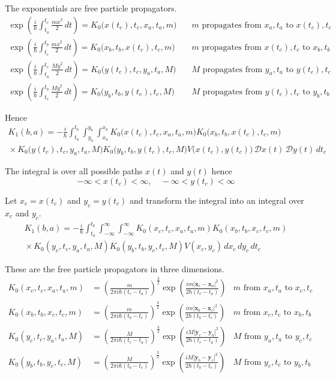 The exponentials are free particle propagators.
\begin{align*}
\exp\left(\frac{i}{\hbar}\int_{t_a}^{t_c}\frac{m\dot x^2}{2}\,dt\right)
=K_0\bigl(x(t_c),t_c,x_a,t_a,m\bigr)
&\quad\text{$m$ propagates from $x_a,t_a$ to $x(t_c),t_c$}
\\
\exp\left(\frac{i}{\hbar}\int_{t_c}^{t_b}\frac{m\dot x^2}{2}\,dt\right)
=K_0\bigl(x_b,t_b,x(t_c),t_c,m\bigr)
&\quad\text{$m$ propagates from $x(t_c),t_c$ to $x_b,t_b$}
\\
\exp\left(\frac{i}{\hbar}\int_{t_a}^{t_c}\frac{M\dot y^2}{2}\,dt\right)
=K_0\bigl(y(t_c),t_c,y_a,t_a,M\bigr)
&\quad\text{$M$ propagates from $y_a,t_a$ to $y(t_c),t_c$}
\\
\exp\left(\frac{i}{\hbar}\int_{t_c}^{t_b}\frac{M\dot y^2}{2}\,dt\right)
=K_0\bigl(y_b,t_b,y(t_c),t_c,M\bigr)
&\quad\text{$M$ propagates from $y(t_c),t_c$ to $y_b,t_b$}
\end{align*}

Hence
\begin{multline*}
K_1(b,a)=-\frac{i}{\hbar}\int_{t_a}^{t_b}\int_{y_a}^{y_b}\int_{x_a}^{x_b}
K_0\bigl(x(t_c),t_c,x_a,t_a,m\bigr)
K_0\bigl(x_b,t_b,x(t_c),t_c,m\bigr)
\\
{}\times
K_0\bigl(y(t_c),t_c,y_a,t_a,M\bigr)
K_0\bigl(y_b,t_b,y(t_c),t_c,M\bigr)
V\bigl(x(t_c),y(t_c)\bigr)
\,\mathscr Dx(t)\,\mathscr Dy(t)\,dt_c
\end{multline*}

The integral is over all possible paths $x(t)$ and $y(t)$ hence
\begin{equation*}
-\infty<x(t_c)<\infty,\quad-\infty<y(t_c)<\infty
\end{equation*}

Let $x_c=x(t_c)$ and $y_c=y(t_c)$ and transform the integral
into an integral over $x_c$ and $y_c$.
\begin{multline*}
K_1(b,a)=-\frac{i}{\hbar}\int_{t_a}^{t_b}\int_{-\infty}^\infty\int_{-\infty}^\infty
K_0(x_c,t_c,x_a,t_a,m)
K_0(x_b,t_b,x_c,t_c,m)
\\
{}\times
K_0(y_c,t_c,y_a,t_a,M)
K_0(y_b,t_b,y_c,t_c,M)
V(x_c,y_c)
\,dx_c\,dy_c\,dt_c
\end{multline*}

These are the free particle propagators in three dimensions.
\begin{align*}
K_0(x_c,t_c,x_a,t_a,m)&=\left(\frac{m}{2\pi i\hbar(t_c-t_a)}\right)^\frac{3}{2}
\exp\left(\frac{im|\mathbf x_c-\mathbf x_a|^2}{2\hbar(t_c-t_a)}\right)
&\text{$m$ from $x_a,t_a$ to $x_c,t_c$}
\\
K_0(x_b,t_b,x_c,t_c,m)&=\left(\frac{m}{2\pi i\hbar(t_b-t_c)}\right)^\frac{3}{2}
\exp\left(\frac{im|\mathbf x_b-\mathbf x_c|^2}{2\hbar(t_b-t_c)}\right)
&\text{$m$ from $x_c,t_c$ to $x_b,t_b$}
\\
K_0(y_c,t_c,y_a,t_a,M)&=\left(\frac{M}{2\pi i\hbar(t_c-t_a)}\right)^\frac{3}{2}
\exp\left(\frac{iM|\mathbf y_c-\mathbf y_a|^2}{2\hbar(t_c-t_a)}\right)
&\text{$M$ from $y_a,t_a$ to $y_c,t_c$}
\\
K_0(y_b,t_b,y_c,t_c,M)&=\left(\frac{M}{2\pi i\hbar(t_b-t_c)}\right)^\frac{3}{2}
\exp\left(\frac{iM|\mathbf y_b-\mathbf y_c|^2}{2\hbar(t_b-t_c)}\right)
&\text{$M$ from $y_c,t_c$ to $y_b,t_b$}
\end{align*}

